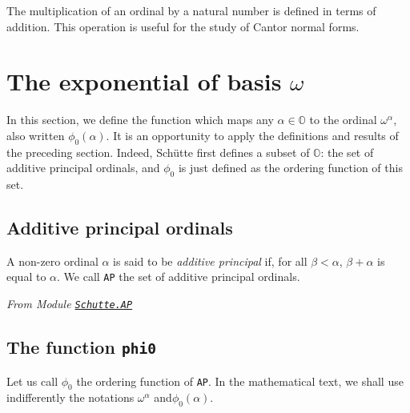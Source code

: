 The multiplication of an ordinal by a natural number is defined in terms of addition.
This operation is useful for the study of Cantor normal forms.



\section{The exponential of basis \texorpdfstring{$\omega$}{omega}}

In this section, we define the function which maps any $\alpha\in\mathbb{O}$ to
the ordinal  $\omega^\alpha$, also written 
$\phi_0(\alpha)$. 
It is an opportunity to apply the definitions and results of the preceding section. 
Indeed,  Schütte first defines a subset of $\mathbb{O}$: the set of additive principal ordinals, and $\phi_0$  is just defined as the ordering function of this set.

\subsection{Additive principal ordinals}


\begin{definition}
A non-zero ordinal  $\alpha$ is said to be \emph{additive principal} if, for all  $\beta<\alpha$, $\beta+\alpha$ is equal to  $\alpha$.
We call \texttt{AP} the set of additive principal ordinals.

\end{definition}



\noindent\emph{From Module \href{../theories/html/hydras.Schutte.AP.html}%
{\texttt{Schutte.AP}}}



\subsection{The function \texttt{phi0}}

Let us call  $\phi_0$ the ordering function of \texttt{AP}.
In the mathematical text, we shall use indifferently the notations  $\omega^\alpha$ and$\phi_0(\alpha)$. 





